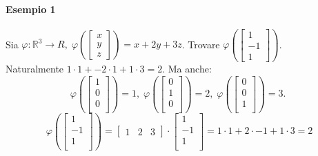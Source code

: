 \documentclass[a4paper, 12pt]{report}
\begin{document}
            \paragraph{Esempio 1}Sia $\varphi:\mathbb{R}^3\rightarrow R,\; \varphi \left (
                \begin{bmatrix}
                    x\\
                    y\\
                    z
                \end{bmatrix}
            \right )=x+2y+3z$. Trovare 
            $
            \varphi \left (
            \begin{bmatrix}
                1\\
                -1\\
                1
            \end{bmatrix}
            \right )
            $.\\
            Naturalmente $1\cdot 1+-2\cdot 1+1\cdot 3=2$. Ma anche:
            $$
            \varphi \left ( 
            \begin{bmatrix}
                1\\
                0\\
                0\\
            \end{bmatrix}    
            \right )
            =1,\;
            \varphi \left ( 
            \begin{bmatrix}
                0\\
                1\\
                0\\
            \end{bmatrix}    
            \right )
            =2,\;
            \varphi \left ( 
            \begin{bmatrix}
                0\\
                0\\
                1\\
            \end{bmatrix}    
            \right )
            =3.\;
            $$
            $$
            \varphi \left ( 
            \begin{bmatrix}
                1\\
                -1\\
                1\\
            \end{bmatrix}    
            \right )
            =
            \begin{bmatrix}
                1 & 2 & 3
            \end{bmatrix}
            \cdot
            \begin{bmatrix}
                1\\
                -1\\
                1\\
            \end{bmatrix}
            =1\cdot 1+2\cdot -1+1 \cdot 3=2 
            $$
\end{document}
